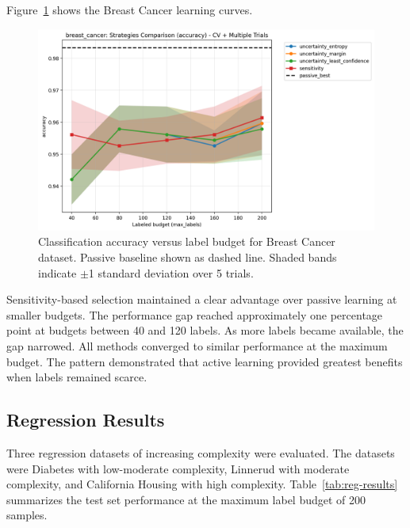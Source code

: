 \documentclass[conference]{IEEEtran}
\begin{document}
Figure~\ref{fig:breast-compare} shows the Breast Cancer learning curves.

\begin{figure}[t]
\centering
\includegraphics[width=0.95\columnwidth]{figures/cls_breast_cancer_comparison_accuracy.png}
\caption{Classification accuracy versus label budget for Breast Cancer dataset. Passive baseline shown as dashed line. Shaded bands indicate $\pm$1 standard deviation over 5 trials.}
\label{fig:breast-compare}
\end{figure}

Sensitivity-based selection maintained a clear advantage over passive learning at smaller budgets. The performance gap reached approximately one percentage point at budgets between 40 and 120 labels. As more labels became available, the gap narrowed. All methods converged to similar performance at the maximum budget. The pattern demonstrated that active learning provided greatest benefits when labels remained scarce.

\subsection{Regression Results}

Three regression datasets of increasing complexity were evaluated. The datasets were Diabetes with low-moderate complexity, Linnerud with moderate complexity, and California Housing with high complexity. Table~\ref{tab:reg-results} summarizes the test set performance at the maximum label budget of 200 samples.
\end{document}
